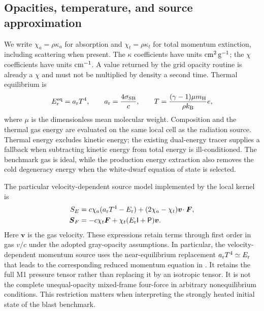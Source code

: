 \documentclass[manuscript]{aastex7}
\newcommand{\vct}[1]{\boldsymbol{#1}}
\newcommand{\Er}{E_{\rm r}}
\newcommand{\Fr}{\vct{F}}
\newcommand{\Prad}{\mathsf{P}}
\newcommand{\Id}{\mathsf{I}}
\newcommand{\ar}{a_{\rm r}}
\begin{document}
\subsection{Opacities, temperature, and source approximation}
We write $\chi_a=\rho\kappa_a$ for absorption and
$\chi_t=\rho\kappa_t$ for total momentum extinction, including scattering
when present. The $\kappa$ coefficients have units ${\rm cm^2\,g^{-1}}$;
the $\chi$ coefficients have units ${\rm cm^{-1}}$. A value returned by
the grid opacity routine is already a $\chi$ and must not be multiplied by
density a second time. Thermal equilibrium is
\begin{equation}
 \Er^{\rm eq}=\ar T^4,\qquad \ar=\frac{4\sigma_{\rm SB}}{c},\qquad
 T=\frac{(\gamma-1)\mu m_{\rm H}}{\rho k_{\rm B}}e,
 \label{eq:eos}
\end{equation}
where $\mu$ is the dimensionless mean molecular weight. Composition and
the thermal gas energy are evaluated on the same local cell as the
radiation source. Thermal energy excludes kinetic energy; the existing
dual-energy tracer supplies a fallback when subtracting kinetic energy
from total energy is ill-conditioned. The benchmark gas is ideal, while
the production energy extraction also removes the cold degeneracy energy
when the white-dwarf equation of state is selected.

The particular velocity-dependent source model implemented by the local
kernel is
\begin{align}
 S_E &= c\chi_a(\ar T^4-\Er)
       +(2\chi_a-\chi_t)\vct{v}\!\cdot\Fr,\label{eq:sourceE}\\
 \vct{S}_F &= -c\chi_t\Fr+
       \chi_t(\Er\Id+\Prad)\vct{v}.\label{eq:sourceF}
\end{align}
Here $\vct{v}$ is the gas velocity. These expressions retain terms through
first order in gas $v/c$ under the adopted gray-opacity assumptions. In
particular, the velocity-dependent momentum source uses the near-equilibrium
replacement $\ar T^4\simeq\Er$ that leads to the corresponding reduced
momentum equation in \citet{SkinnerOstriker2013}. It retains the full M1
pressure tensor rather than replacing it by an isotropic tensor. It is not
the complete unequal-opacity mixed-frame four-force in arbitrary
nonequilibrium conditions. This restriction matters when interpreting the
strongly heated initial state of the blast benchmark.
\end{document}
